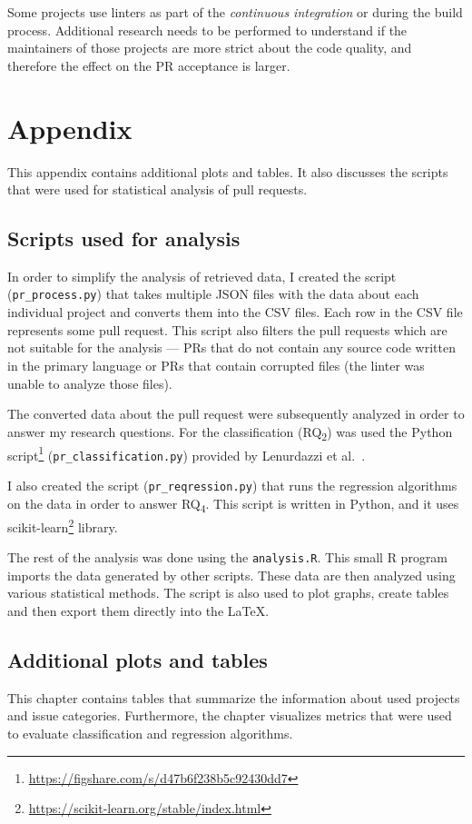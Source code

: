 \documentclass[digital,oneside,oldtable,nolof,nolot,nocover]{fithesis4}
\begin{document}
Some projects use linters as part of the \emph{continuous integration} or
during the build process. Additional research needs to be performed to
understand if the maintainers of those projects are more strict about the
code quality, and therefore the effect on the PR acceptance is larger.
\chapter*{Appendix}
\label{sec:org3dc1d42}
\pagestyle{plain}
This appendix contains additional plots and tables. It also discusses the scripts that were
used for statistical analysis of pull requests.
\section*{Scripts used for analysis}
\label{sec:orgee057be}
In order to simplify the analysis of retrieved data, I created the script (\texttt{pr\_process.py}) that
takes multiple JSON files with the data about each individual project and
converts them into the CSV files. Each row in the CSV file represents some
pull request. This script also filters the pull requests which are not
suitable for the analysis --- PRs that do not contain any source code written
in the primary language or PRs that contain corrupted files (the linter was
unable to analyze those files).

The converted data about the pull request were subsequently analyzed in order
to answer my research questions. For the classification (RQ\textsubscript{2}) was used the Python
script\footnote{\url{https://figshare.com/s/d47b6f238b5c92430dd7}} (\texttt{pr\_classification.py}) provided by Lenurdazzi
et al.~\cite{quality}.

I also created the script (\texttt{pr\_reqression.py}) that runs the regression algorithms on the data in order to answer RQ\textsubscript{4}.
This script is written in Python, and it uses scikit-learn\footnote{\url{https://scikit-learn.org/stable/index.html}} library.

The rest of the analysis was done using the \texttt{analysis.R}. This small R program imports the data
generated by other scripts. These data are then analyzed using various statistical methods.
The script is also used to plot graphs, create tables and then export them directly into the \LaTeX{}.
\section*{Additional plots and tables}
\label{sec:org1735be9}
This chapter contains tables that summarize the information about used projects and issue categories.
Furthermore, the chapter visualizes metrics that were used to evaluate classification and regression algorithms.
\newpage
{}
\end{document}
